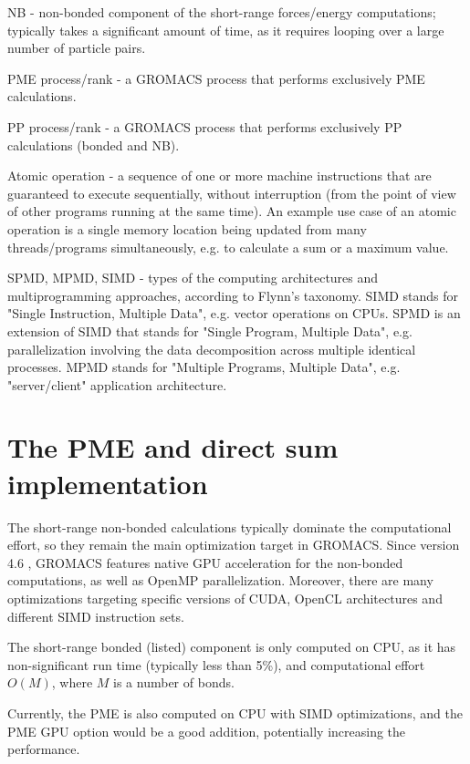 \documentclass[12pt,a4paper,notitlepage]{report}
\begin{document}
NB - non-bonded component of the short-range forces/energy computations; typically takes a significant amount of time, as it requires looping over a large number of particle pairs. 

PME process/rank - a GROMACS process that performs exclusively PME calculations.

PP process/rank - a GROMACS process that performs exclusively PP calculations (bonded and NB).  

Atomic operation - a sequence of one or more machine instructions that are guaranteed to execute sequentially, without interruption (from the point of view of other programs running at the same time). An example use case of an atomic operation is a single memory location being updated from many threads/programs simultaneously, e.g. to calculate a sum or a maximum value.

SPMD, MPMD, SIMD - types of the computing architectures and multiprogramming approaches, according to Flynn's taxonomy. SIMD stands for "Single Instruction, Multiple Data", e.g. vector operations on CPUs. 
SPMD is an extension of SIMD that stands for "Single Program, Multiple Data", e.g. parallelization involving the data decomposition across multiple identical processes. MPMD stands for "Multiple Programs, Multiple Data", e.g. "server/client" application architecture.


\section{The PME and direct sum implementation} \label{rangeimpl}

The short-range non-bonded calculations typically dominate the computational effort, so they remain the main optimization target in GROMACS. Since version 4.6 \cite{gromacs46}, GROMACS features native GPU acceleration for the non-bonded computations, as well as OpenMP parallelization. Moreover, there are many optimizations targeting specific versions of CUDA, OpenCL architectures and different SIMD instruction sets. 

The short-range bonded (listed) component is only computed on CPU, as it has non-significant run time (typically less than 5\%), and computational effort $O(M)$, where $M$ is a number of bonds. 

Currently, the PME is also computed on CPU with SIMD optimizations, and the PME GPU option would be a good addition, potentially increasing the performance. 
\end{document}
